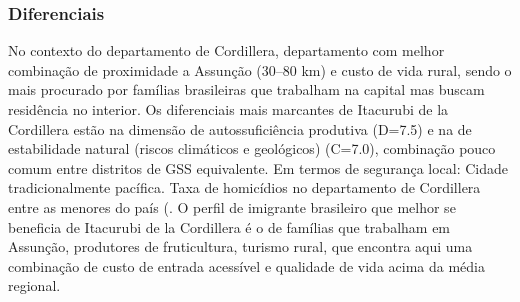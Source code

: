 \subsubsection*{Diferenciais}\label{dif-itacurubi-de-la-cordillera-0309}
No contexto do departamento de Cordillera, departamento com melhor combinação de proximidade a Assunção (30–80 km) e custo de vida rural, sendo o mais procurado por famílias brasileiras que trabalham na capital mas buscam residência no interior. Os diferenciais mais marcantes de Itacurubi de la Cordillera estão na dimensão de autossuficiência produtiva (D=7.5) e na de estabilidade natural (riscos climáticos e geológicos) (C=7.0), combinação pouco comum entre distritos de GSS equivalente. Em termos de segurança local: Cidade tradicionalmente pacífica. Taxa de homicídios no departamento de Cordillera entre as menores do país (. O perfil de imigrante brasileiro que melhor se beneficia de Itacurubi de la Cordillera é o de famílias que trabalham em Assunção, produtores de fruticultura, turismo rural, que encontra aqui uma combinação de custo de entrada acessível e qualidade de vida acima da média regional.
